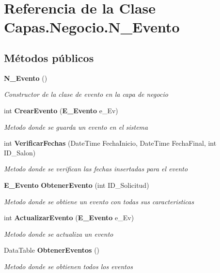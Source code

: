 \section{Referencia de la Clase Capas.\+Negocio.\+N\+\_\+\+Evento}
\label{class_capas_1_1_negocio_1_1_n___evento}
\subsection*{Métodos públicos}
\begin{DoxyCompactItemize}
\item 
{\bf N\+\_\+\+Evento} ()
\begin{DoxyCompactList}\small\item\em Constructor de la clase de evento en la capa de negocio \end{DoxyCompactList}\item 
int {\bf Crear\+Evento} ({\bf E\+\_\+\+Evento} e\+\_\+\+Ev)
\begin{DoxyCompactList}\small\item\em Metodo donde se guarda un evento en el sistema \end{DoxyCompactList}\item 
int {\bf Verificar\+Fechas} (Date\+Time Fecha\+Inicio, Date\+Time Fecha\+Final, int I\+D\+\_\+\+Salon)
\begin{DoxyCompactList}\small\item\em Metodo donde se verifican las fechas insertadas para el evento \end{DoxyCompactList}\item 
{\bf E\+\_\+\+Evento} {\bf Obtener\+Evento} (int I\+D\+\_\+\+Solicitud)
\begin{DoxyCompactList}\small\item\em Metodo donde se obtiene un evento con todas sus caracteristicas \end{DoxyCompactList}\item 
int {\bf Actualizar\+Evento} ({\bf E\+\_\+\+Evento} e\+\_\+\+Ev)
\begin{DoxyCompactList}\small\item\em Metodo donde se actualiza un evento \end{DoxyCompactList}\item 
Data\+Table {\bf Obtener\+Eventos} ()
\begin{DoxyCompactList}\small\item\em Metodo donde se obtienen todos los eventos \end{DoxyCompactList}\item 

\end{DoxyCompactItemize}
